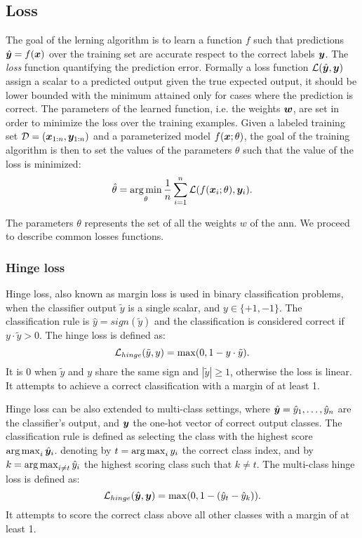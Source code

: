 \subsection{Loss}
The goal of the lerning algorithm is to learn a function $f$ such that
predictions $\hat{\bm{y}}=f(\bm{x})$ over the training set are accurate respect
to the correct labels $\bm{y}$. The \emph{loss} function quantifying
the prediction error. Formally a loss function
$\mathcal{L}(\hat{\bm{y}},\bm{y})$ assign a scalar to a predicted output
given the true expected output, it should be lower bounded with the
minimum attained only for cases where the prediction is correct. The
parameters of the learned function, i.e. the weights $\bm{w}$, are
set in order to minimize the loss over the training examples. Given a
labeled training set $\mathcal{D}=(\bm{x}_{1:n},\bm{y}_{1:n})$ and a
parameterized model $f(\bm{x};\theta)$, the goal of the training
algorithm is then to set the values of the parameters $\theta$
such that the value of the loss is minimized:
\begin{equation}\label{eq:lossmin}
  \hat\theta=\operatorname*{arg\,min}_\theta\frac{1}{n}\sum_{i=1}^n\mathcal{L}(f(\bm{x}_i;\theta),\bm{y}_i).
\end{equation}

The parameters $\theta$ represents the set of all the weights $w$ of
the \ac{ann}. 
We proceed to describe common losses functions.

\subsubsection{Hinge loss}
Hinge loss, also known as margin loss is used in binary classification
problems, when the classifier output $\tilde{y}$ is a single scalar, and
$y\in\{+1,-1\}$. The classification rule is $\hat{y}=sign(\tilde{y})$
and the classification is considered correct if
$y\cdot\tilde{y}>0$. The hinge loss is defined as:
\begin{equation*}
  \mathcal{L}_{hinge}(\tilde{y},y)=\max(0,1-y\cdot\tilde{y}).
\end{equation*}
It is $0$ when $\tilde{y}$ and $y$ share the same sign and
$|\tilde{y}|\geq 1$, otherwise the loss is linear. It attempts to
achieve a correct classification with a margin of at least 1.

Hinge loss can be also extended to multi-class settings, where
$\hat{\bm{y}}=\hat{y}_1,\dots,\hat{y}_n$ are the classifier's
output, and $\bm{y}$ the one-hot vector of correct output
classes. The classification rule is defined as selecting the class
with the highest score $\operatorname*{arg\,max}_i\hat{\bm{y}}_i$. denoting by
$t=\operatorname*{arg\,max}_iy_i$ the correct class index, and by $k=\operatorname*{arg\,max}_{i\neq
  t}\hat{y}_i$ the highest scoring class such that $k\neq t$. The
multi-class hinge loss is defined as:
\begin{equation*}
  \mathcal{L}_{hinge}(\hat{\bm{y}},
  \bm{y})=\max(0,1-(\hat{y}_t-\hat{y}_k)).
\end{equation*}
It attempts to score the correct class above all other classes with a
margin of at least 1.

